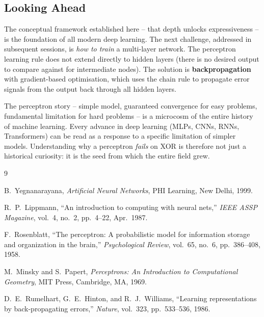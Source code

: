 \documentclass[12pt,a4paper]{article}
\begin{document}
\subsection{Looking Ahead}
\label{subsec:ahead}

The conceptual framework established here -- that depth unlocks
expressiveness -- is the foundation of all modern deep learning.  The
next challenge, addressed in subsequent sessions, is \emph{how to train}
a multi-layer network.  The perceptron learning rule does not extend
directly to hidden layers (there is no desired output to compare against
for intermediate nodes).  The solution is \textbf{backpropagation} with
gradient-based optimisation, which uses the chain rule to propagate error
signals from the output back through all hidden layers.

\begin{keyinsight}[title=Key Insight -- The Road from Perceptron to Deep Learning]
The perceptron story -- simple model, guaranteed convergence for easy
problems, fundamental limitation for hard problems -- is a microcosm of
the entire history of machine learning.  Every advance in deep learning
(MLPs, CNNs, RNNs, Transformers) can be read as a response to a specific
limitation of simpler models.  Understanding why a perceptron \emph{fails}
on XOR is therefore not just a historical curiosity: it is the seed from
which the entire field grew.
\end{keyinsight}

\newpage
\begin{thebibliography}{9}

B.~Yegnanarayana,
\textit{Artificial Neural Networks},
PHI Learning, New Delhi, 1999.

R.~P.~Lippmann,
``An introduction to computing with neural nets,''
\textit{IEEE ASSP Magazine}, vol.~4, no.~2, pp.~4--22, Apr.~1987.

F.~Rosenblatt,
``The perceptron: A probabilistic model for information storage and
organization in the brain,''
\textit{Psychological Review}, vol.~65, no.~6, pp.~386--408, 1958.

M.~Minsky and S.~Papert,
\textit{Perceptrons: An Introduction to Computational Geometry},
MIT Press, Cambridge, MA, 1969.

D.~E.~Rumelhart, G.~E.~Hinton, and R.~J.~Williams,
``Learning representations by back-propagating errors,''
\textit{Nature}, vol.~323, pp.~533--536, 1986.

\end{thebibliography}

\clearpage
\end{document}
